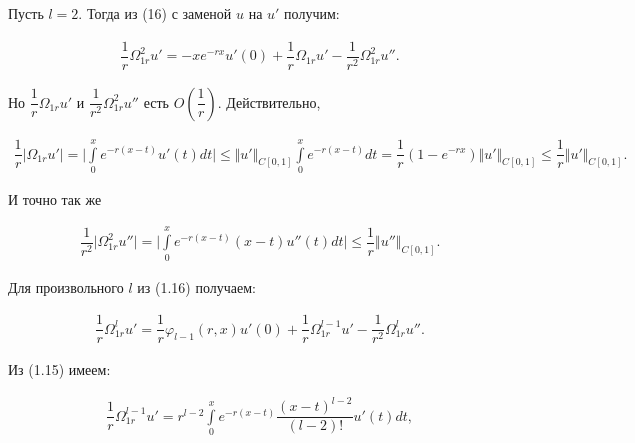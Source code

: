 Пусть $ l = 2 $. Тогда из (16) с заменой $ u $ на $ u' $ получим:

\begin{equation}
\begin{array}{c}
\nonumber

\dfrac{1}{r}\Omega_{1r}^2u' = -xe^{-rx}u'(0) + \dfrac{1}{r}\Omega_{1r}u' - \dfrac{1}{r^2}\Omega_{1r}^2u''.

\end{array}
\end{equation}

Но $ \dfrac{1}{r}\Omega_{1r}u' $ и $ \dfrac{1}{r^2}\Omega_{1r}^2u'' $ есть $ O(\dfrac{1}{r}) $. Действительно,

\begin{equation}
\begin{array}{c}
\nonumber

\dfrac{1}{r}\vert\Omega_{1r}u'\vert = \bigl\vert \int\limits_0^x e^{-r(x-t)}u'(t)dt \bigr\vert \leq \Vert u' \Vert_{C[0,1]} \int\limits_0^x e^{-r(x-t)}dt = \dfrac{1}{r}(1 - e^{-rx})\Vert u' \Vert_{C[0,1]} \leq \dfrac{1}{r} \Vert u' \Vert_{C[0,1]}.

\end{array}
\end{equation}

И точно так же

\begin{equation}
\begin{array}{c}
\nonumber

\dfrac{1}{r^2} \vert \Omega_{1r}^2u'' \vert = \bigl| \int\limits_0^x e^{-r(x-t)}(x-t)u''(t)dt \bigr| \leq \dfrac{1}{r} \Vert u'' \Vert_{C[0,1]}.

\end{array}
\end{equation}

Для произвольного $ l $ из (1.16) получаем:

\begin{equation}
\begin{array}{c}

\dfrac{1}{r} \Omega_{1r}^lu' = \dfrac{1}{r} \varphi_{l-1}(r,x)u'(0) + \dfrac{1}{r}\Omega_{1r}^{l-1}u' - \dfrac{1}{r^2} \Omega_{1r}^lu''.

\end{array}
\end{equation}

Из (1.15) имеем:

\begin{equation}
\begin{array}{c}

\dfrac{1}{r}\Omega_{1r}^{l-1}u' = r^{l-2}\int\limits_0^x e^{-r(x-t)}\dfrac{(x-t)^{l-2}}{(l-2)!}u'(t)dt,

\end{array}
\end{equation}

